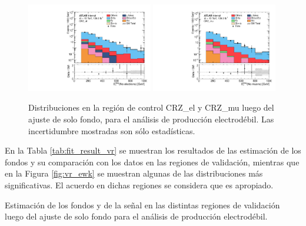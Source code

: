 \begin{figure}

\centering
    \includegraphics[width=0.49\textwidth]{images/analysis_EWK/v192_1_nosyst/can_CRZ_el_met_noele_et_afterFit.pdf}
    \includegraphics[width=0.49\textwidth]{images/analysis_EWK/v192_1_nosyst/can_CRZ_mu_met_nomuon_et_afterFit.pdf}

    \caption{Distribuciones en la región de control CRZ\_el y CRZ\_mu luego del ajuste de solo fondo, para el análisis de producción electrodébil. Las incertidumbre mostradas son sólo estadísticas.}
    \label{fig:crz_el_mu_dist_ewk}
\end{figure}



En la Tabla \ref{tab:fit_result_vr} se muestran los resultados de las estimación de los fondos y su comparación con los datos en las regiones de validación, mientras que en la Figura \ref{fig:vr_ewk} se muestran algunas de las distribuciones más significativas. El acuerdo en dichas regiones se considera que es apropiado. 

\begin{table}[ht!]
  \centering
  \caption{Estimación de los fondos y de la señal en las distintas regiones de validación luego del ajuste de solo fondo para el análisis de producción electrodébil.}
  \resizebox{\textwidth}{!}{}
  \label{tab:fit_result_vr}
\end{table}


